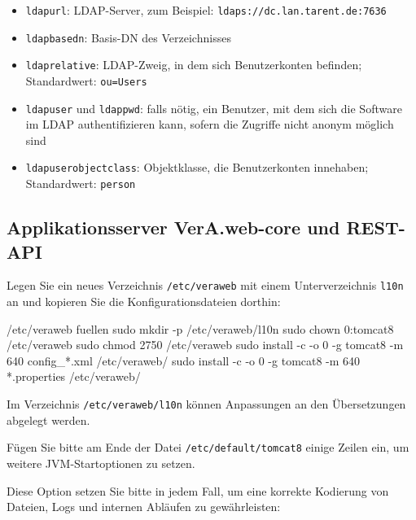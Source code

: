 \documentclass{tarentanleitung}
\begin{document}
\begin{itemize}
 \item{\texttt{ldapurl}: LDAP-Server, zum Beispiel:
  \texttt{ldaps://dc.lan.tarent.de:7636}}
 \item{\texttt{ldapbasedn}: Basis-DN des Verzeichnisses}
 \item{\texttt{ldaprelative}: LDAP-Zweig, in dem sich Benutzerkonten
  befinden; Standardwert: \texttt{ou=Users}}
 \item{\texttt{ldapuser} und \texttt{ldappwd}: falls nötig, ein
  Benutzer, mit dem sich die Software im LDAP authentifizieren kann,
  sofern die Zugriffe nicht anonym möglich sind}
 \item{\texttt{ldapuserobjectclass}: Objektklasse, die Benutzerkonten
  innehaben; Standardwert: \texttt{person}}
\end{itemize}


\subsection{Applikationsserver VerA.web-core und REST-API}\label{subsec:setup-core-tomcat}

\begin{minipage}{\linewidth}
Legen Sie ein neues Verzeichnis \texttt{/etc/veraweb} mit einem
Unterverzeichnis \texttt{l10n} an und kopieren Sie die
Konfigurationsdateien dorthin:

\begin{lstdump}{/etc/veraweb fuellen}
sudo mkdir -p /etc/veraweb/l10n
sudo chown 0:tomcat8 /etc/veraweb
sudo chmod 2750 /etc/veraweb
sudo install -c -o 0 -g tomcat8 -m 640 config_*.xml /etc/veraweb/
sudo install -c -o 0 -g tomcat8 -m 640 *.properties /etc/veraweb/
\end{lstdump}
\end{minipage}

Im Verzeichnis \texttt{/etc/veraweb/l10n} können Anpassungen an
den Übersetzungen abgelegt werden. %

Fügen Sie bitte am Ende der Datei \texttt{/etc/default/tomcat8}
einige Zeilen ein, um weitere JVM-Startoptionen zu setzen.

\begin{minipage}{\linewidth}
Diese Option setzen Sie bitte in jedem Fall, um eine korrekte
Kodierung von Dateien, Logs und internen Abläufen zu gewährleisten:

\end{minipage}
\end{document}
